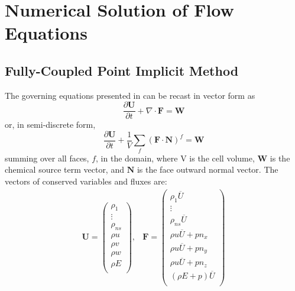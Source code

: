 \chapter{Numerical Solution of Flow Equations}
\label{chapter-three}

\section{Fully-Coupled Point Implicit Method}

The governing equations presented in  can
be recast in vector form as
\begin{equation}
	\label{inv_flux_vec}
	\frac{\partial \mathbf{U}}{\partial t}
	+ \nabla\cdot \mathbf{F} = \mathbf{W}
\end{equation}
 or, in semi-discrete form,
\begin{equation}
	\label{inv_flux_fv}
	\frac{\partial \mathbf{U}}{\partial t}
	 + \frac{1}{V}\sum\limits_{f}(\mathbf{F}\cdot\mathbf{N})^f = \mathbf{W}
 \end{equation}
summing over all faces, $f$, in the domain, where V is the cell volume, 
$\mathbf{W}$ is the chemical source term vector, and $\mathbf{N}$ is the face
outward normal vector.  The vectors of conserved variables and fluxes are:
\begin{equation}
	\begin{matrix}
	\mathbf{U}=\begin{pmatrix}
   		\rho_1\\
		\vdots \\
		\rho_{ns} \\
		\rho u \\
		\rho v \\
		\rho w \\
		\rho E \\
	\end{pmatrix},      &
 	\mathbf{F} = \begin{pmatrix}
		\rho_1  \overline{U} \\
		\vdots \\
		\rho_{ns} \overline{U} \\
		\rho u \overline{U} + p n_x\\
		\rho u \overline{U} + p n_y\\
		\rho u \overline{U} + p n_z\\
		(\rho E + p) \overline{U} \\
	\end{pmatrix}
	\end{matrix}
 \end{equation}
